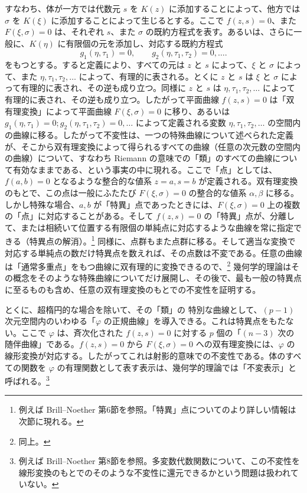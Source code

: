 \documentclass[11pt]{article}
\begin{document}
すなわち、体が一方では代数元 \(s\) を \(K(z)\) に添加することによって、他方では \(\sigma\) を \(K(\xi)\) に添加することによって生じるとする。ここで \(f(z,s)=0\)、また \(F(\xi,\sigma)=0\) は、それぞれ \(s\)、また \(\sigma\) の既約方程式を表す。あるいは、さらに一般に、\(K(\eta)\) に有限個の元を添加し、対応する既約方程式
\[
g_1(\eta,\tau_1)=0,\qquad g_2(\eta,\tau_1,\tau_2)=0,\ldots .
\]
をもつとする。すると定義により、すべての元は \(z\) と \(s\) によって、\(\xi\) と \(\sigma\) によって、また \(\eta,\tau_1,\tau_2,\ldots\) によって、有理的に表される。とくに \(z\) と \(s\) は \(\xi\) と \(\sigma\) によって有理的に表され、その逆も成り立つ。同様に \(z\) と \(s\) は \(\eta,\tau_1,\tau_2,\ldots\) によって有理的に表され、その逆も成り立つ。したがって平面曲線 \(f(z,s)=0\) は「双有理変換」によって平面曲線 \(F(\xi,\sigma)=0\) に移り、あるいは \(g_1(\eta,\tau_1)=0; g_2(\eta,\tau_1,\tau_2)=0,\ldots\) によって定義される変数 \(\eta,\tau_1,\tau_2,\ldots\) の空間内の曲線に移る。したがって不変性は、一つの特殊曲線について述べられた定義が、そこから双有理変換によって得られるすべての曲線（任意の次元数の空間内の曲線）について、すなわち Riemann の意味での「類」のすべての曲線について有効なままである、という事実の中に現れる。ここで「点」としては、\(f(a,b)=0\) となるような整合的な値系 \(z=a,s=b\) が定義される。双有理変換のもとで、この点は一般にふたたび \(F(\xi,\sigma)=0\) の整合的な値系 \(\alpha,\beta\) に移る。しかし特殊な場合、\(a,b\) が「特異」点であったときには、\(F(\xi,\sigma)=0\) 上の複数の「点」に対応することがある。そして \(f(z,s)=0\) の「特異」点が、分離して、または相続いて位置する有限個の単純点に対応するような曲線を常に指定できる（特異点の解消）。\footnote{例えば Brill--Noether 第6節を参照。「特異」点についてのより詳しい情報は次節に現れる。} 同様に、点群もまた点群に移る。そして適当な変換で対応する単純点の数だけ特異点を数えれば、その点数は不変である。任意の曲線は「通常多重点」をもつ曲線に双有理的に変換できるので、\footnote{同上。} 幾何学的理論はその概念をそのような特殊曲線についてだけ展開し、その後で、最も一般の特異点に至るものも含め、任意の双有理変換のもとでの不変性を証明する。

とくに、超楕円的な場合を除いて、その「類」の 特別な曲線として、\((p-1)\) 次元空間内のいわゆる「\(\varphi\) の正規曲線」を導入できる。これは特異点をもたない。ここで \(\varphi\) は、斉次化された \(f(z,s)=0\) に対する \(p\) 個の「\((n-3)\) 次の随伴曲線」である。\(f(z,s)=0\) から \(F(\xi,\sigma)=0\) への双有理変換には、\(\varphi\) の線形変換が対応する。したがってこれは射影的意味での不変性である。体のすべての関数を \(\varphi\) の有理関数として表す表示は、幾何学的理論では「不変表示」と呼ばれる。\footnote{例えば Brill--Noether 第8節を参照。多変数代数関数について、この不変性を線形変換のもとでのそのような不変性に還元できるかという問題は扱われていない。}
\end{document}

